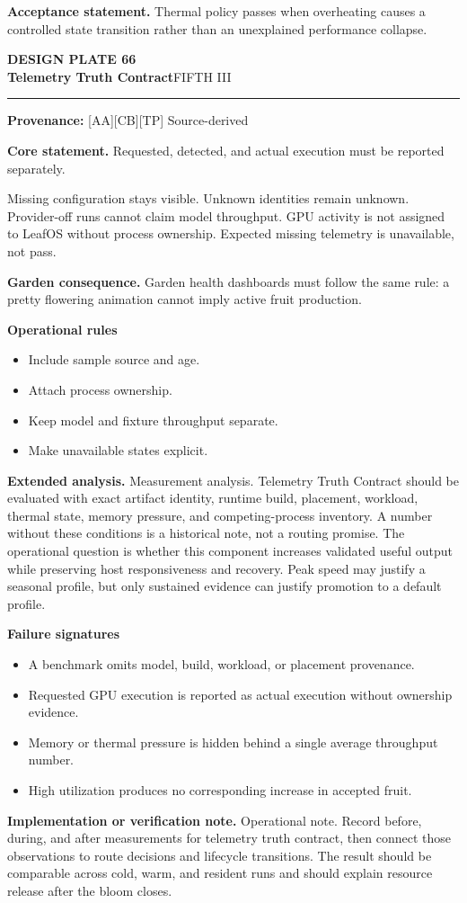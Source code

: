 \documentclass[10pt,letterpaper,oneside]{article}
\newcommand{\prov}[1]{\textcolor{gardenBlue}{\sffamily\footnotesize\textbf{Provenance:} #1}}
\newcommand{\platetitle}[3]{%
  \begin{minipage}[t][0.54in][t]{\textwidth}
  {\sffamily\bfseries\color{gardenDeep}\fontsize{9}{10}\selectfont DESIGN PLATE #1}\\[-1pt]
  {\sffamily\bfseries\color{gardenInk}\fontsize{16.5}{18}\selectfont #2}\hfill{\sffamily\color{gardenGreen}\large #3}
  \end{minipage}\vspace{-2pt}\hrule\vspace{5pt}}
\begin{document}
\begin{acceptbox}
\textbf{Acceptance statement.} Thermal policy passes when overheating causes a controlled state transition rather than an unexplained performance collapse.
\end{acceptbox}
\newpage
\platetitle{66}{Telemetry Truth Contract}{FIFTH III}
\prov{[AA][CB][TP] Source-derived}
\fontsize{8.85}{10.45}\selectfont
\begin{corebox}
\textbf{Core statement.} Requested, detected, and actual execution must be reported separately.
\end{corebox}
Missing configuration stays visible. Unknown identities remain unknown. Provider-off runs cannot claim model throughput. GPU activity is not assigned to LeafOS without process ownership. Expected missing telemetry is unavailable, not pass.

\textbf{Garden consequence.} Garden health dashboards must follow the same rule: a pretty flowering animation cannot imply active fruit production.

\textbf{Operational rules}
\begin{itemize}
\item Include sample source and age.
\item Attach process ownership.
\item Keep model and fixture throughput separate.
\item Make unavailable states explicit.
\end{itemize}
\textbf{Extended analysis.} Measurement analysis. Telemetry Truth Contract should be evaluated with exact artifact identity, runtime build, placement, workload, thermal state, memory pressure, and competing-process inventory. A number without these conditions is a historical note, not a routing promise. The operational question is whether this component increases validated useful output while preserving host responsiveness and recovery. Peak speed may justify a seasonal profile, but only sustained evidence can justify promotion to a default profile.

\textbf{Failure signatures}
\begin{itemize}
\item A benchmark omits model, build, workload, or placement provenance.
\item Requested GPU execution is reported as actual execution without ownership evidence.
\item Memory or thermal pressure is hidden behind a single average throughput number.
\item High utilization produces no corresponding increase in accepted fruit.
\end{itemize}
\textbf{Implementation or verification note.} Operational note. Record before, during, and after measurements for telemetry truth contract, then connect those observations to route decisions and lifecycle transitions. The result should be comparable across cold, warm, and resident runs and should explain resource release after the bloom closes.
\end{document}
